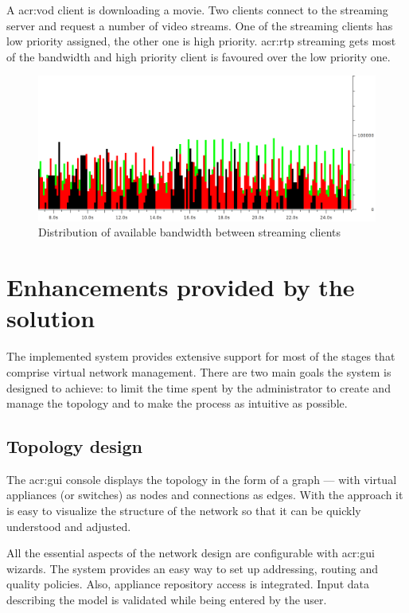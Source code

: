 \documentclass[11pt]{book}
\begin{document}
        A \gls{acr:vod} client is downloading a movie. Two clients connect to the streaming server and request a number of video
        streams. One of the streaming clients has low priority assigned, the other one is high priority. \gls{acr:rtp} streaming
        gets most of the bandwidth and high priority client is favoured over the low priority one.

        \begin{figure}[H]
          \begin{center}
            \includegraphics[width=.7\textwidth]{img/test-case/exp-all.png}
          \end{center}

          \caption{Distribution of available bandwidth between streaming clients}
        \end{figure}


    \section{Enhancements provided by the solution}
    \label{sec:uc:enhance}

      The implemented system provides extensive support for most of the stages that comprise virtual network management.
      There are two main goals the system is designed to achieve: to limit the time spent by the administrator to create
      and manage the topology and to make the process as intuitive as possible.


      \subsection{Topology design}
      \label{sub:uc:enhance:design}

        The \gls{acr:gui} console displays the topology in the form of a graph --- with virtual appliances (or switches) as nodes
        and connections as edges. With the approach it is easy to visualize the structure of the network so that it can
        be quickly understood and adjusted.

        All the essential aspects of the network design are configurable with \gls{acr:gui} wizards. The system provides an easy
        way to set up addressing, routing and quality policies. Also, appliance repository access is integrated. Input
        data describing the model is validated while being entered by the user. 
\end{document}
